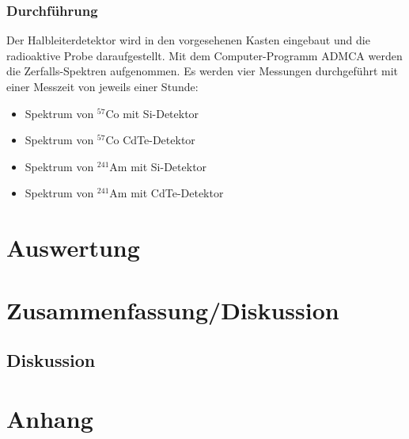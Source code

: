 \documentclass[12pt]{article}
\begin{document}
\subsubsection{Durchführung}

Der Halbleiterdetektor wird in den vorgesehenen Kasten eingebaut und die radioaktive Probe daraufgestellt. Mit dem Computer-Programm ADMCA werden die Zerfalls-Spektren aufgenommen. Es werden vier Messungen durchgeführt mit einer Messzeit von jeweils einer Stunde:

\begin{itemize}
	\item Spektrum von $^{57}$Co mit Si-Detektor
	\item Spektrum von $^{57}$Co  CdTe-Detektor
	\item Spektrum von $^{241}$Am  mit Si-Detektor
	\item Spektrum von $^{241}$Am mit CdTe-Detektor
\end{itemize} 


\newpage
\section{Auswertung}



\newpage
\section{Zusammenfassung/Diskussion}




\subsection{Diskussion}\label{Diskussion}


\newpage
\section{Anhang}






%


%
\end{document}
